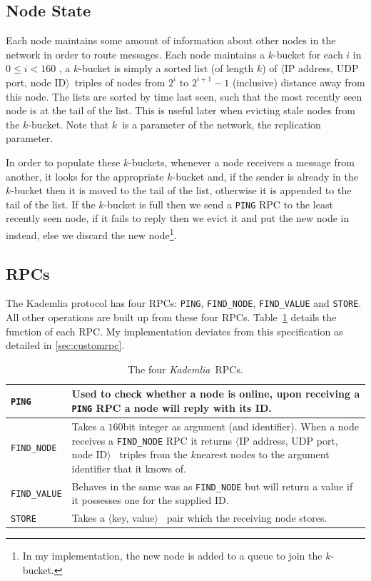 \documentclass[12pt,notitlepage,a4paper]{report}
\newcommand{\kademlia}{\emph{Kademlia}}
\newcommand{\K}{$k$}
\begin{document}
	\subsection{Node State}
	Each node maintains some amount of information about other nodes in the network in order to route messages. Each node maintains a \K-bucket for each $i$ in $0 \leq i < 160$ , a \K-bucket is simply a sorted list (of length \K) of $\langle$IP address, UDP port, node ID$\rangle$~triples of nodes from $2^i$ to $2^{i+1}-1$ (inclusive) distance away from this node. The lists are sorted by time last seen, such that the most recently seen node is at the tail of the list. This is useful later when evicting stale nodes from the \K-bucket. Note that \K~is a parameter of the network, the replication parameter.
	
	In order to populate these \K-buckets, whenever a node receivers a message from another, it looks for the appropriate \K-bucket and, if the sender is already in the \K-bucket then it is moved to the tail of the list, otherwise it is appended to the tail of the list. If the \K-bucket is full then we send a \texttt{PING} RPC to the least recently seen node, if it fails to reply then we evict it and put the new node in instead, else we discard the new node\footnote{In my implementation, the new node is added to a queue to join the \K-bucket.}.
	
	\subsection{RPCs}
	The Kademlia protocol has four RPCs: \texttt{PING}, \texttt{FIND\_NODE}, \texttt{FIND\_VALUE} and \texttt{STORE}. All other operations are built up from these four RPCs. Table~\ref{tab:rpcs} details the function of each RPC. My implementation deviates from this specification as detailed in \cref{sec:customrpc}.
	
	\begin{table}[!ht]
		\begin{tabularx}{\textwidth}{| l | X |}
			\hline
			\texttt{PING} & Used to check whether a node is online, upon receiving a \texttt{PING} RPC a node will reply with its ID.\\
			\hline
			\texttt{FIND\_NODE} & Takes a $160$bit integer as argument (and identifier). When a node receives a \texttt{FIND\_NODE} RPC it returns $\langle$IP address, UDP port, node ID$\rangle$~ triples from the \K nearest nodes to the argument identifier that it knows of.\\
			\hline
			\texttt{FIND\_VALUE} & Behaves in the same was as \texttt{FIND\_NODE} but will return a value if it possesses one for the supplied ID.\\
			\hline
			\texttt{STORE} & Takes a $\langle$key, value$\rangle$~ pair which the receiving node stores.\\
			\hline
		\end{tabularx}
		\caption{The four \kademlia~RPCs.}
		\label{tab:rpcs}
	\end{table}
	
\end{document}
